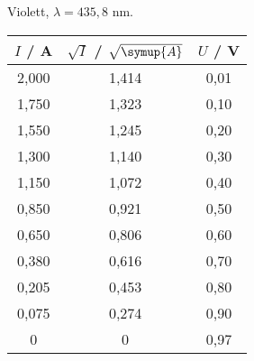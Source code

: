 \begin{subtable}{0.4\textwidth}
\centering
 \caption{Violett, $\lambda = 435,8 $ nm.} 
        \begin{tabular}{c c c}
            \toprule
            { $I$ / A} & {$\sqrt{I}$ / $\sqrt{\symup{A}}$} & {$U$ / V} \\
            \midrule
               2,000 & 1,414 & 0,01 \\
               1,750 & 1,323 & 0,10 \\
               1,550 & 1,245 & 0,20 \\
               1,300 & 1,140 & 0,30 \\
               1,150 & 1,072 & 0,40 \\
               0,850 & 0,921 & 0,50 \\
               0,650 & 0,806 & 0,60 \\
               0,380 & 0,616 & 0,70 \\
               0,205 & 0,453 & 0,80 \\
               0,075 & 0,274 & 0,90 \\
               0     & 0& 0,97 \\
         \bottomrule
        \end{tabular}
       
        \end{subtable}